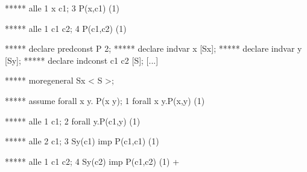    ***** alle 1 x c1;
   3   P(x,c1)     (1)

   ***** alle 1 c1 c2;
   4   P(c1,c2)     (1)
   
   ***** declare predconst P 2;
   ***** declare indvar x [Sx];
   ***** declare indvar y [Sy];
   ***** declare indconst c1 c2 [S];
   [...]

   ***** moregeneral Sx < S >;

   ***** assume forall x y. P(x y);
   1   forall x y.P(x,y)     (1)

   ***** alle 1 c1;
   2   forall y.P(c1,y)     (1)

   ***** alle 2 c1;
   3   Sy(c1) imp P(c1,c1)     (1)

   ***** alle 1 c1 c2;
   4   Sy(c2) imp P(c1,c2)     (1)
+

